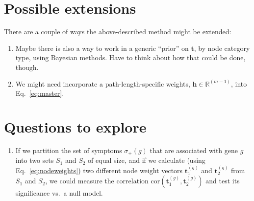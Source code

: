 \documentclass[11pt,notitlepage,english]{article}
\begin{document}
\section{Possible extensions}
There are a couple of ways the above-described method might be extended:
\begin{enumerate}
  \item Maybe there is also a way to work in a generic ``prior'' on ${\boldsymbol t}$,
    by node category type, using Bayesian methods. Have to think about how that could be done, though.
  \item We might need incorporate a path-length-specific weights,
    ${\boldsymbol h} \in {\mathbb R}^{(m-1)}$, into Eq.~\ref{eq:master}.
\end{enumerate}

\section{Questions to explore}
\begin{enumerate}
\item If we partition the set of symptoms $\sigma_{+}(g)$ that are associated with gene $g$ into two sets $S_1$ and $S_2$
  of equal size, and if we calculate (using Eq.~\ref{eq:nodeweights}) two different node weight vectors
  ${\boldsymbol t}^{(g)}_1$ and ${\boldsymbol t}^{(g)}_2$ from $S_1$ and $S_2$, we could measure the correlation
  $\textrm{cor}({\boldsymbol t}^{(g)}_1, {\boldsymbol t}^{(g)}_2)$ and test its significance vs.\ a null model.
\end{enumerate}

\appendix
\end{document}
